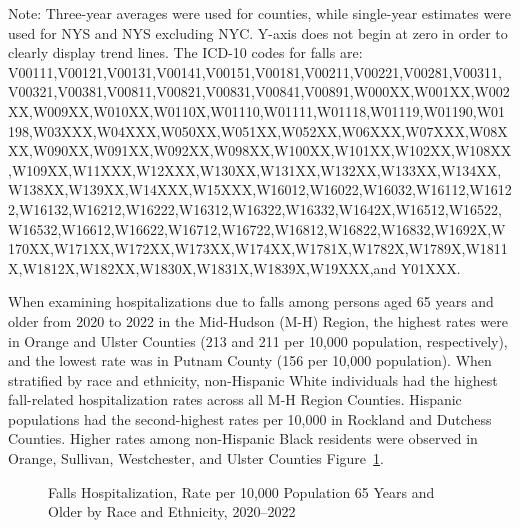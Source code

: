 \documentclass[
  english,
  letterpaper,
]{report}
\begin{document}
\begin{tcolorbox}[enhanced jigsaw, breakable, leftrule=.75mm, title=\textcolor{quarto-callout-note-color}{\faInfo}\hspace{0.5em}{Note}, bottomrule=.15mm, opacityback=0, left=2mm, colback=white, bottomtitle=1mm, coltitle=black, colbacktitle=quarto-callout-note-color!10!white, colframe=quarto-callout-note-color-frame, opacitybacktitle=0.6, toptitle=1mm, titlerule=0mm, arc=.35mm, rightrule=.15mm, toprule=.15mm]

Note: Three-year averages were used for counties, while single-year
estimates were used for NYS and NYS excluding NYC. Y-axis does not begin
at zero in order to clearly display trend lines. The ICD-10 codes for
falls are:
V00111,V00121,V00131,V00141,V00151,V00181,V00211,V00221,V00281,V00311,V00321,V00381,V00811,V00821,V00831,V00841,V00891,W000XX,W001XX,W002XX,W009XX,W010XX,W0110X,W01110,W01111,W01118,W01119,W01190,W01198,W03XXX,W04XXX,W050XX,W051XX,W052XX,W06XXX,W07XXX,W08XXX,W090XX,W091XX,W092XX,W098XX,W100XX,W101XX,W102XX,W108XX,W109XX,W11XXX,W12XXX,W130XX,W131XX,W132XX,W133XX,W134XX,W138XX,W139XX,W14XXX,W15XXX,W16012,W16022,W16032,W16112,W16122,W16132,W16212,W16222,W16312,W16322,W16332,W1642X,W16512,W16522,W16532,W16612,W16622,W16712,W16722,W16812,W16822,W16832,W1692X,W170XX,W171XX,W172XX,W173XX,W174XX,W1781X,W1782X,W1789X,W1811X,W1812X,W182XX,W1830X,W1831X,W1839X,W19XXX,and
Y01XXX.

\end{tcolorbox}

When examining hospitalizations due to falls among persons aged 65 years
and older from 2020 to 2022 in the Mid-Hudson (M-H) Region, the highest
rates were in Orange and Ulster Counties (213 and 211 per 10,000
population, respectively), and the lowest rate was in Putnam County (156
per 10,000 population). When stratified by race and ethnicity,
non-Hispanic White individuals had the highest fall-related
hospitalization rates across all M-H Region Counties. Hispanic
populations had the second-highest rates per 10,000 in Rockland and
Dutchess Counties. Higher rates among non-Hispanic Black residents were
observed in Orange, Sullivan, Westchester, and Ulster Counties
Figure~\ref{fig-65-falls-hospital-rande-rate}.

\begin{figure}


\caption{\label{fig-65-falls-hospital-rande-rate}Falls Hospitalization,
Rate per 10,000 Population 65 Years and Older by Race and Ethnicity,
2020--2022}

\end{figure}%
\end{document}
